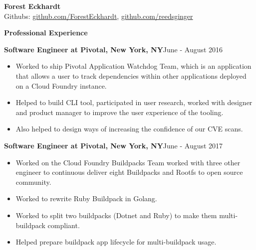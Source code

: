 \documentclass[10pt,a4papaer]{article}
\begin{document}
	{\selectfont
		
		\begin{center}	
			{\huge\textbf{Forest Eckhardt}} \\
			Githubs:
			\href{http://www.github.com/ForestEckhardt}{github.com/ForestEckhardt}, \href{http://www.github.com/reedsginger}{github.com/reedsginger}  \\
		\end{center}
		
		{\noindent\textbf{Professional Experience}}\vspace*{-20px}\\
		
		\noindent\makebox[\linewidth]{\rule{\textwidth}{1.2pt}}
		
		\setlength{\leftskip}{15pt}
		
		{\noindent\textbf{Software Engineer at Pivotal, New York, NY}}{\hfill June - August 2016}
		
		\begin{itemize}[noitemsep, topsep=0pt]
			\item Worked to ship Pivotal Application Watchdog Team, which is an application that allows a user to track dependencies within other applications deployed on a Cloud Foundry instance. 
			\item Helped to build CLI tool, participated in user research, worked with designer and product manager to improve the user experience of the tooling. \item Also helped to design ways of increasing the confidence of our CVE scans.\\
		\end{itemize}
		
		{\noindent\textbf{Software Engineer at Pivotal, New York, NY}}{\hfill June - August 2017}
		\begin{itemize}[noitemsep, topsep=0pt]
			\item Worked on the Cloud Foundry Buildpacks Team worked with three other engineer to continuous deliver eight Buildpacks and Rootfs to open source community. 
			\item Worked to rewrite Ruby Buildpack in Golang.
			\item Worked to split two buildpacks (Dotnet and Ruby) to make them multi-buildpack compliant.
			\item Helped prepare buildpack app lifecycle for multi-buildpack usage.\\
			

\end{itemize}}
\end{document}
